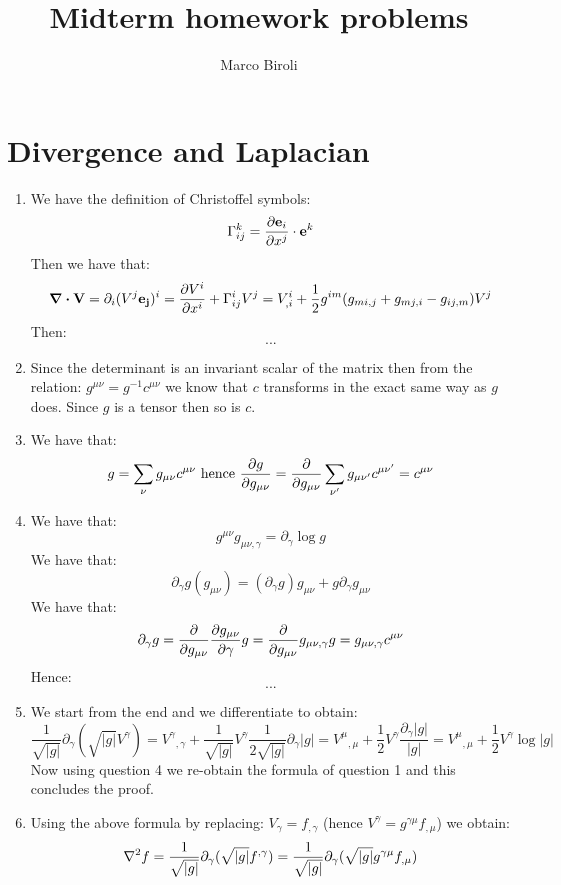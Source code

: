 \documentclass[10pt,a4paper]{article}
\author{Marco Biroli}
\title{Midterm homework problems}
\begin{document}
\maketitle

\section{Divergence and Laplacian}

\begin{enumerate}

\item We have the definition of Christoffel symbols:
\[
\Gamma_{ij}^k = \pdv{\vb{e}_i}{x^j} \cdot \vb{e}^k
\]
Then we have that:
\[
\div \vb{V} = \partial_i ( V^j \vb{e_j})^i = \pdv{V^i}{x^i} + \Gamma^i_{i j} V^j = V^i_{, i} + \frac{1}{2} g^{im} ( g_{mi, j} + g_{mj, i} - g_{i j, m} ) V^j
\]
Then:
\[
...
\]

\item Since the determinant is an invariant scalar of the matrix then from the relation: $g^{\mu\nu} = g^{-1} c^{\mu \nu}$ we know that $c$ transforms in the exact same way as $g$ does. Since $g$ is a tensor then so is $c$. 

\item We have that:
\[
g = \sum_\nu g_{\mu \nu} c^{\mu \nu} \mbox{~hence~} \pdv{g}{g_{\mu \nu}} = \pdv{}{g_{\mu \nu}} \sum_{\nu'} g_{\mu \nu'} c^{\mu \nu'} = c^{\mu \nu}
\]

\item We have that:
\[
g^{\mu \nu} g_{\mu \nu, \gamma} = \partial_\gamma \log g 
\]
We have that:
\[
\partial_\gamma g (g_{\mu \nu}) = (\partial_\gamma g) g_{\mu \nu} + g \partial_\gamma g_{\mu \nu} 
\]
We have that:
\[
\partial_\gamma g = \pdv{}{g_{\mu \nu}} \pdv{g_{\mu \nu}}{\gamma} g = \pdv{}{g_{\mu \nu}} g_{\mu \nu, \gamma} g = g_{\mu \nu, \gamma} c^{\mu \nu}
\]
Hence:
\[
...
\]

\item We start from the end and we differentiate to obtain:
\[
\frac{1}{\sqrt{|g|}} \partial_\gamma (\sqrt{|g|} V^\gamma) = {V^\gamma}_{, \gamma} + \frac{1}{\sqrt{|g|}} V^\gamma \frac{1}{2 \sqrt{|g|}} \partial_\gamma |g| = {V^\mu}_{, \mu} + \frac{1}{2} V^\gamma \frac{\partial_\gamma |g|}{|g|} = {V^\mu}_{, \mu} + \frac{1}{2} V^\gamma \log|g|
\]
Now using question 4 we re-obtain the formula of question 1 and this concludes the proof.

\item Using the above formula by replacing: $V_\gamma = f_{, \gamma}$ (hence $V^\gamma = g^{\gamma \mu} f_{,\mu}$) we obtain:
\[
\laplacian f = \frac{1}{\sqrt{|g|}} \partial_\gamma( \sqrt{|g|} f^{,\gamma} ) = \frac{1}{\sqrt{|g|}} \partial_\gamma( \sqrt{|g|} g^{\gamma \mu}f_{,\mu} )
\] 


\end{enumerate}
\end{document}

